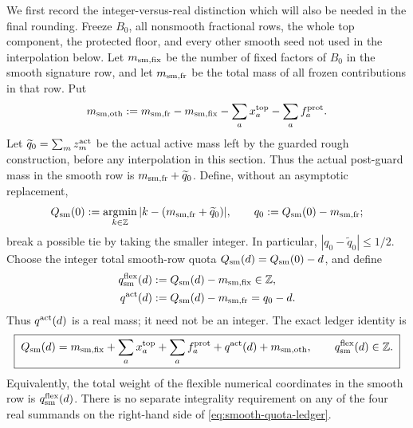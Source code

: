 \documentclass[11pt]{article}
\numberwithin{equation}{section}
\theoremstyle{definition}
\theoremstyle{remark}
\newcommand{\1}{\mathbf 1}
\begin{document}
We first record the integer-versus-real distinction which will also be
needed in the final rounding.  Freeze \(B_0\), all nonsmooth fractional
rows, the whole top component, the protected floor, and every other
smooth seed not used in the interpolation below.  Let
\(m_{\rm sm,fix}\) be the number of fixed factors of \(B_0\) in the
smooth signature row, and let \(m_{\rm sm,fr}\) be the total mass of all
frozen contributions in that row.  Put
\[
 m_{\rm sm,oth}:=m_{\rm sm,fr}-m_{\rm sm,fix}
       -\sum_a x_a^{\rm top}-\sum_a f_a^{\rm prot}.
\]
Let \(\widetilde q_0=\sum_m z_m^{\rm act}\) be the actual active mass
left by the guarded rough construction, before any interpolation in this
section.  Thus the actual post-guard mass in the smooth row is
\(m_{\rm sm,fr}+\widetilde q_0\).  Define, without an asymptotic
replacement,
\begin{equation}
 Q_{\rm sm}(0):=\operatorname*{argmin}_{k\in\mathbb Z}
       |k-(m_{\rm sm,fr}+\widetilde q_0)|,
 \qquad q_0:=Q_{\rm sm}(0)-m_{\rm sm,fr};
 \label{eq:smooth-nearest-actual-quota}
\end{equation}
break a possible tie by taking the smaller integer.  In particular,
\(|q_0-\widetilde q_0|\leq1/2\).  Choose the integer total smooth-row
quota \(Q_{\rm sm}(d)=Q_{\rm sm}(0)-d\), and define
\begin{align}
 q_{\rm sm}^{\rm flex}(d)
   &:=Q_{\rm sm}(d)-m_{\rm sm,fix}\in\mathbb Z,
       \label{eq:smooth-flexible-integer-quota}\\
 q^{\rm act}(d)
   &:=Q_{\rm sm}(d)-m_{\rm sm,fr}=q_0-d.
       \label{eq:smooth-active-real-mass}
\end{align}
Thus \(q^{\rm act}(d)\) is a real mass; it need not be an integer.
The exact ledger identity is
\begin{equation}
\boxed{\;
 Q_{\rm sm}(d)=m_{\rm sm,fix}
 +\sum_a x_a^{\rm top}+\sum_a f_a^{\rm prot}
 +q^{\rm act}(d)+m_{\rm sm,oth},
 \qquad q_{\rm sm}^{\rm flex}(d)\in\mathbb Z .
\;}
\label{eq:smooth-quota-ledger}
\end{equation}
Equivalently, the total weight of the flexible numerical coordinates in
the smooth row is \(q_{\rm sm}^{\rm flex}(d)\).  There is no separate
integrality requirement on any of the four real summands on the
right-hand side of \eqref{eq:smooth-quota-ledger}.
\end{document}

